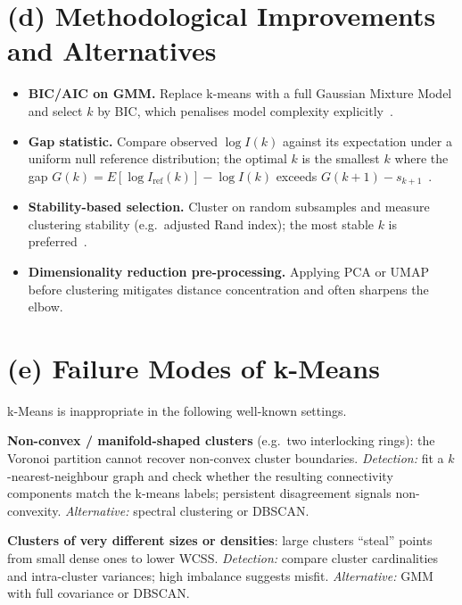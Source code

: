 \documentclass[10pt,a4paper]{article}
\begin{document}
\section*{(d) Methodological Improvements and Alternatives}

\begin{itemize}\setlength\itemsep{1pt}\setlength\topsep{1pt}
  \item \textbf{BIC/AIC on GMM.} Replace k-means with a full Gaussian Mixture
        Model and select $k$ by BIC, which penalises model complexity
        explicitly~\cite{mclachlan2000mixture}.
  \item \textbf{Gap statistic.} Compare observed $\log I(k)$ against its
        expectation under a uniform null reference distribution; the optimal $k$
        is the smallest $k$ where the gap $G(k)=E[\log I_{\text{ref}}(k)]-\log
        I(k)$ exceeds $G(k+1)-s_{k+1}$~\cite{tibshirani2001estimating}.
  \item \textbf{Stability-based selection.} Cluster on random subsamples and
        measure clustering stability (e.g.\ adjusted Rand index); the most
        stable $k$ is preferred~\cite{ben2002stability}.
  \item \textbf{Dimensionality reduction pre-processing.} Applying PCA or
        UMAP before clustering mitigates distance concentration and often
        sharpens the elbow.
\end{itemize}

\section*{(e) Failure Modes of k-Means}

k-Means is inappropriate in the following well-known settings.

\textbf{Non-convex / manifold-shaped clusters} (e.g.\ two interlocking rings):
the Voronoi partition cannot recover non-convex cluster boundaries.
\emph{Detection:} fit a $k$-nearest-neighbour graph and check whether the
resulting connectivity components match the k-means labels; persistent
disagreement signals non-convexity.  \emph{Alternative:} spectral clustering
or DBSCAN.

\textbf{Clusters of very different sizes or densities}: large clusters
``steal'' points from small dense ones to lower WCSS.
\emph{Detection:} compare cluster cardinalities and intra-cluster variances; high
imbalance suggests misfit.  \emph{Alternative:} GMM with full covariance or
DBSCAN.
\end{document}
